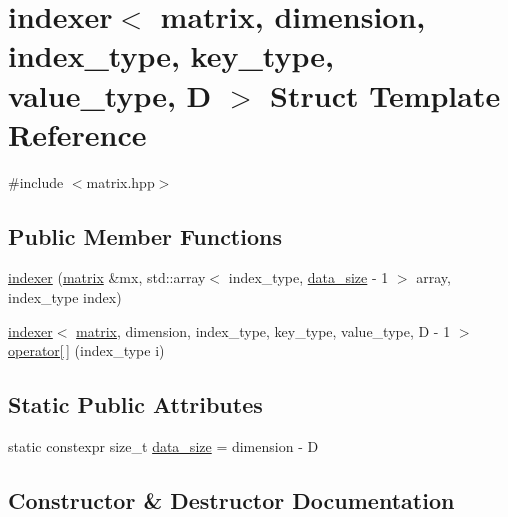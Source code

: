 \hypertarget{structindexer}{}\section{indexer$<$ matrix, dimension, index\+\_\+type, key\+\_\+type, value\+\_\+type, D $>$ Struct Template Reference}
\label{structindexer}


{\ttfamily \#include $<$matrix.\+hpp$>$}

\subsection*{Public Member Functions}
\begin{DoxyCompactItemize}
\item 
\hyperlink{structindexer_ad69a52be877d2ba7476d0aeadaf75c19}{indexer} (\hyperlink{structmatrix}{matrix} \&mx, std\+::array$<$ index\+\_\+type, \hyperlink{structindexer_a895fa35da574edcb525dcb7705f771b2}{data\+\_\+size} -\/ 1 $>$ array, index\+\_\+type index)
\item 
\hyperlink{structindexer}{indexer}$<$ \hyperlink{structmatrix}{matrix}, dimension, index\+\_\+type, key\+\_\+type, value\+\_\+type, D -\/ 1 $>$ \hyperlink{structindexer_a1d3df5b1ea8654fa272ecb3bb0e5d799}{operator\mbox{[}$\,$\mbox{]}} (index\+\_\+type i)
\end{DoxyCompactItemize}
\subsection*{Static Public Attributes}
\begin{DoxyCompactItemize}
\item 
static constexpr size\+\_\+t \hyperlink{structindexer_a895fa35da574edcb525dcb7705f771b2}{data\+\_\+size} = dimension -\/ D
\end{DoxyCompactItemize}


\subsection{Constructor \& Destructor Documentation}
\mbox{\label{structindexer_ad69a52be877d2ba7476d0aeadaf75c19}} 
